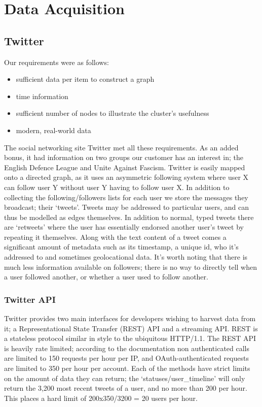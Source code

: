 \section{Data Acquisition}

\subsection{Twitter}
Our requirements were as follows:
\begin{itemize}
\item sufficient data per item to construct a graph
\item time information
\item sufficient number of nodes to illustrate the cluster’s usefulness
\item modern, real-world data
\end{itemize}

The social networking site Twitter met all these requirements. As an added bonus, it had information on two groups our customer has an interest in; the English Defence League and Unite Against Fascism. Twitter is easily mapped onto a directed graph, as it uses an asymmetric following system where user X can follow user Y without user Y having to follow user X. In addition to collecting the following/followers lists for each user we store the messages they broadcast; their `tweets'. Tweets may be addressed to particular users, and can thus be modelled as edges themselves. In addition to normal, typed tweets there are  `retweets' where the user has essentially endorsed another user’s tweet by repeating it themselves. Along with the text content of a tweet comes a significant amount of metadata such as its timestamp, a unique id, who it’s addressed to and sometimes geolocational data. It’s worth noting that there is much less information available on followers; there is no way to directly tell when a user followed another, or whether a user used to follow another.

\subsubsection{Twitter API}
Twitter provides two main interfaces for developers wishing to harvest data from it; a Representational State Transfer (REST) API and a streaming API. REST is a stateless protocol similar in style to the ubiquitous HTTP/1.1. The REST API is heavily rate limited; according to the documentation non authenticated calls are limited to 150 requests per hour per IP, and OAuth-authenticated requests are limited to 350 per hour per account. Each of the methods have strict limits on the amount of data they can return; the `statuses/user\_timeline' will only return the 3,200 most recent tweets of a user, and no more than 200 per hour. This places a hard limit of 200x350/3200 = 20 users per hour.

